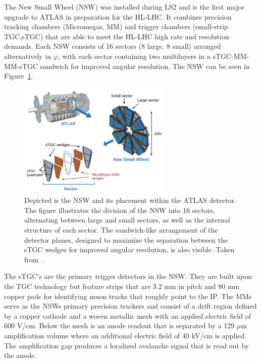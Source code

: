 
The New Small Wheel (NSW) was installed during LS2 and is the first major upgrade to ATLAS in preparation for the HL-LHC\@. It combines precision tracking chambers (Micromegas, MM) and trigger chambers (small-strip TGC,sTGC) that are able to meet the HL-LHC high rate and resolution demands. Each NSW consists of 16 sectors (8 large, 8 small) arranged alternatively in $\varphi$, with each sector containing two multilayers in a sTGC-MM-MM-sTGC sandwich for improved angular resolution. The NSW can be seen in Figure~\ref{fig:atlas_nsw}.

\begin{figure}[htp]
    \centering
    \includegraphics[width=0.65\textwidth]{figures/atlas/atlas_NSW.png}
    \caption{Depicted is the NSW and its placement within the ATLAS detector. The figure illustrates the division of the NSW into 16 sectors, alternating between large and small sectors, as well as the internal structure of each sector. The sandwich-like arrangement of the detector planes, designed to maximize the separation between the sTGC wedges for improved angular resolution, is also visible. Taken from~\cite{NSW_image}.}\label{fig:atlas_nsw}
\end{figure}

The sTGC's are the primary trigger detectors in the NSW\@. They are built upon the TGC technology but feature strips that are 3.2 mm in pitch and 80 mm copper pads for identifying muon tracks that roughly point to the IP. The MMs serve as the NSWs primary precision trackers and consist of a drift region defined by a copper cathode and a woven metallic mesh with an applied electric field of 600 V/cm. Below the mesh is an anode readout that is separated by a 129 $\mu$m amplification volume where an additional electric field of 40 kV/cm is applied. The amplification gap produces a localized avalanche signal that is read out by the anode.
